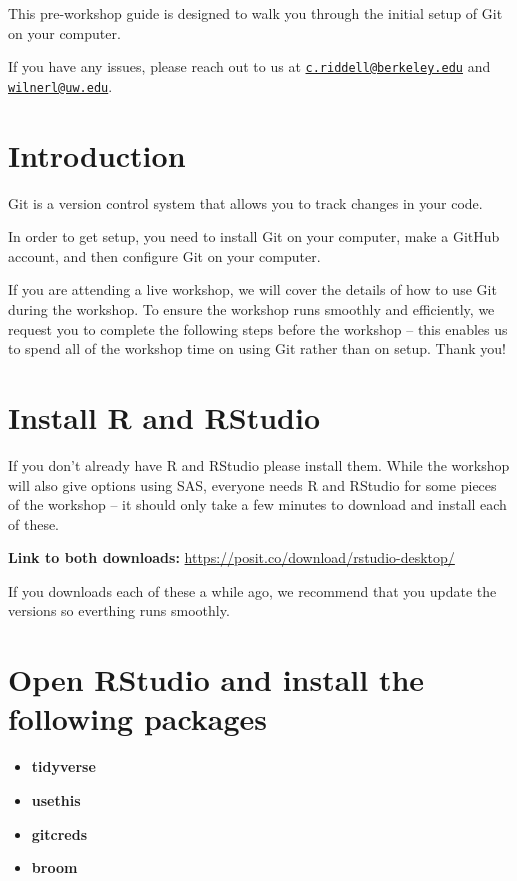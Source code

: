 \documentclass[
]{book}
\providecommand{\tightlist}{%
  \setlength{\itemsep}{0pt}\setlength{\parskip}{0pt}}
\begin{document}
This pre-workshop guide is designed to walk you through the initial setup of Git
on your computer.

If you have any issues, please reach out to us at \href{mailto:c.riddell@berkeley.edu}{\nolinkurl{c.riddell@berkeley.edu}} and
\href{mailto:wilnerl@uw.edu}{\nolinkurl{wilnerl@uw.edu}}.

\section{Introduction}\label{introduction}

Git is a version control system that allows you to track changes in your code.

In order to get setup, you need to install Git on your computer, make a GitHub
account, and then configure Git on your computer.

If you are attending a live workshop, we will cover the details of how to use
Git during the workshop. To ensure the workshop runs smoothly and efficiently,
we request you to complete the following steps before the workshop -- this
enables us to spend all of the workshop time on using Git rather than on setup.
Thank you!

\section{Install R and RStudio}\label{install-r-and-rstudio}

If you don't already have R and RStudio please install them. While the workshop
will also give options using SAS, everyone needs R and RStudio for some pieces
of the workshop -- it should only take a few minutes to download and install
each of these.

\textbf{Link to both downloads:} \url{https://posit.co/download/rstudio-desktop/}

If you downloads each of these a while ago, we recommend that you update the
versions so everthing runs smoothly.

\section{Open RStudio and install the following packages}\label{open-rstudio-and-install-the-following-packages}

\begin{itemize}
\tightlist
\item
  \textbf{tidyverse}
\item
  \textbf{usethis}
\item
  \textbf{gitcreds}
\item
  \textbf{broom}
\end{itemize}
\end{document}
